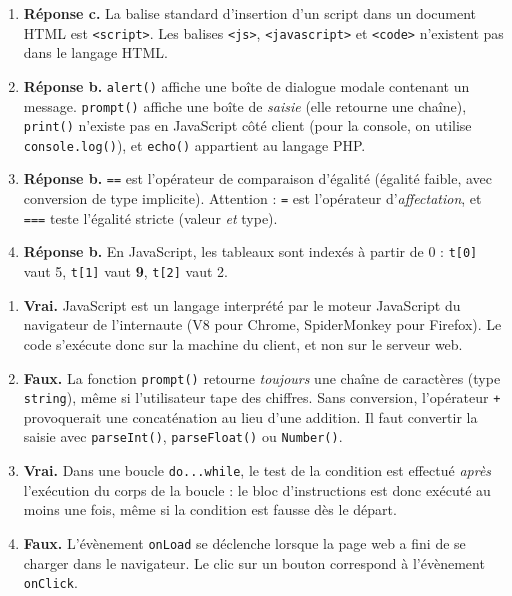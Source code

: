 \documentclass[11pt]{article}
\newcommand{\cle}[1]{{\popxbold\color{popdark}#1}}
\newcounter{popsec}
\newcounter{popsub}
\newcommand{\courssub}[1]{%
  \stepcounter{popsub}%
  \par\vspace{9pt}\noindent{\popxbold\fontsize{11.5}{13}\selectfont\color{popink}{\color{poporange}\thepopsec.\thepopsub}\hspace{6pt}#1}\par\nopagebreak\vspace{4pt}
}
\begin{document}
\courssub{Je vérifie mes connaissances}

\begin{corrige}
\begin{enumerate}
\item \textbf{Réponse c.} La balise standard d'insertion d'un script dans un document HTML est \texttt{<script>}. Les balises \texttt{<js>}, \texttt{<javascript>} et \texttt{<code>} n'existent pas dans le langage HTML.
\item \textbf{Réponse b.} \texttt{alert()} affiche une boîte de dialogue modale contenant un message. \texttt{prompt()} affiche une boîte de \emph{saisie} (elle retourne une chaîne), \texttt{print()} n'existe pas en JavaScript côté client (pour la console, on utilise \texttt{console.log()}), et \texttt{echo()} appartient au langage PHP.
\item \textbf{Réponse b.} \texttt{==} est l'opérateur de comparaison d'égalité (égalité faible, avec conversion de type implicite). Attention : \texttt{=} est l'opérateur d'\emph{affectation}, et \texttt{===} teste l'égalité stricte (valeur \emph{et} type).
\item \textbf{Réponse b.} En JavaScript, les tableaux sont indexés à partir de \cle{0} : \texttt{t[0]} vaut 5, \texttt{t[1]} vaut \textbf{9}, \texttt{t[2]} vaut 2.
\end{enumerate}
\end{corrige}

\begin{corrige}
\begin{enumerate}
\item \textbf{Vrai.} JavaScript est un langage interprété par le moteur JavaScript du navigateur de l'internaute (V8 pour Chrome, SpiderMonkey pour Firefox). Le code s'exécute donc sur la machine du client, et non sur le serveur web.
\item \textbf{Faux.} La fonction \texttt{prompt()} retourne \emph{toujours} une chaîne de caractères (type \texttt{string}), même si l'utilisateur tape des chiffres. Sans conversion, l'opérateur \texttt{+} provoquerait une concaténation au lieu d'une addition. Il faut convertir la saisie avec \texttt{parseInt()}, \texttt{parseFloat()} ou \texttt{Number()}.
\item \textbf{Vrai.} Dans une boucle \texttt{do...while}, le test de la condition est effectué \emph{après} l'exécution du corps de la boucle : le bloc d'instructions est donc exécuté au moins une fois, même si la condition est fausse dès le départ.
\item \textbf{Faux.} L'évènement \texttt{onLoad} se déclenche lorsque la page web a fini de se charger dans le navigateur. Le clic sur un bouton correspond à l'évènement \texttt{onClick}.
\end{enumerate}
\end{corrige}
\end{document}
